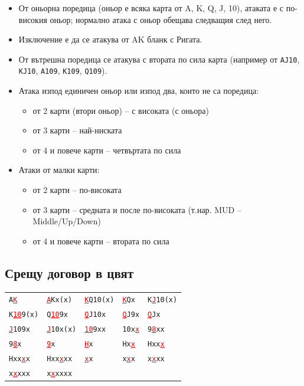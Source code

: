 \documentclass[10pt,a5paper]{extarticle}
\newcommand{\leadhil}[1]{\textcolor{red}{\uline{#1}}}
\begin{document}
\begin{itemize}
    \item[] От оньорна поредица (оньор е всяка карта от A, K, Q, J, 10), атаката е с по-високия оньор; нормално атака с оньор обещава следващия след него.  
    \item[] Изключение е да се атакува от AK бланк с Ригата.  
    \item[] От вътрешна поредица се атакува с втората по сила карта (например от \texttt{AJ10}, \texttt{KJ10}, \texttt{A109}, \texttt{K109}, \texttt{Q109}).  
    \item[] Атака изпод единичен оньор или изпод два, които не са поредица:  
        \begin{itemize}
            \item[] от 2 карти (втори оньор) -- с високата (с оньора)  
            \item[] от 3 карти -- най-ниската  
            \item[] от 4 и повече карти -- четвъртата по сила  
        \end{itemize}
    \item[] Атаки от малки карти:  
        \begin{itemize}
            \item[] от 2 карти -- по-високата  
            \item[] от 3 карти -- средната и после по-високата (т.нар. MUD – Middle/Up/Down)  
            \item[] от 4 и повече карти -- втората по сила  
        \end{itemize}
\end{itemize}

\subsection*{Срещу договор в цвят}

\begin{center}
\renewcommand{\arraystretch}{1.3} %
\setlength{\tabcolsep}{6pt}       %

\begin{tabularx}{\textwidth}{|X|X|X|X|X|}
\hline
\texttt{A\leadhil{K}} & \texttt{\leadhil{A}Kx(x)} & \texttt{\leadhil{K}Q10(x)} & \texttt{\leadhil{K}Qx} & \texttt{K\leadhil{J}10(x)} \\
\texttt{K\leadhil{10}9(x)} & \texttt{Q\leadhil{10}9x} & \texttt{\leadhil{Q}J10x} & \texttt{\leadhil{Q}J9x} & \texttt{\leadhil{Q}Jx} \\
\texttt{\leadhil{J}109x} & \texttt{\leadhil{J}10x(x)} & \texttt{\leadhil{10}9xx} & \texttt{10x\leadhil{x}} & \texttt{9\leadhil{8}xx} \\
\texttt{9\leadhil{8}x} & \texttt{\leadhil{9}x} & \texttt{\leadhil{H}x} & \texttt{Hx\leadhil{x}} & \texttt{Hxx\leadhil{x}} \\
\texttt{Hxx\leadhil{x}x} & \texttt{Hxx\leadhil{x}xx} & \texttt{\leadhil{x}x} & \texttt{x\leadhil{x}x} & \texttt{x\leadhil{x}xx} \\
\texttt{x\leadhil{x}xxx} & \texttt{x\leadhil{x}xxxx} & & & \\ %
\hline
\end{tabularx}
\end{center}
\end{document}
